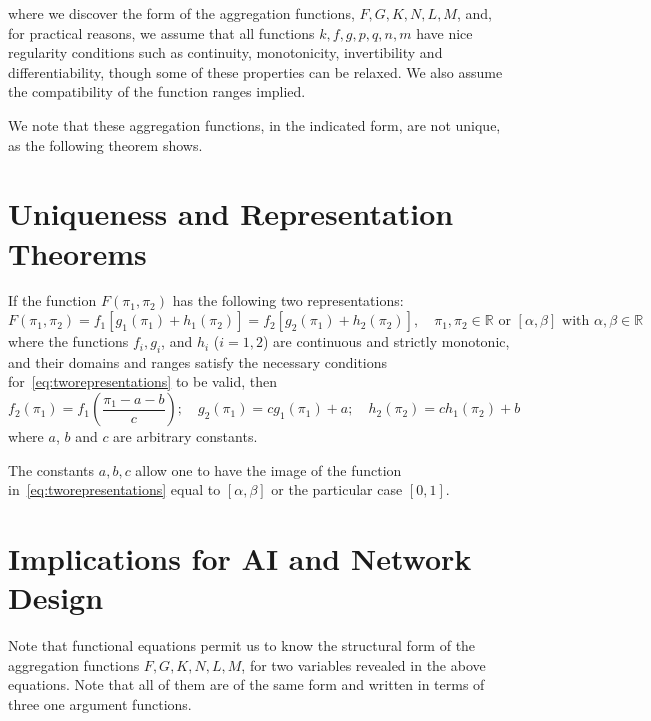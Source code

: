 \documentclass[
	11pt, %
	fleqn, %
	a4paper, %
]{LegrandOrangeBook}
\begin{document}
where we discover the form of the aggregation functions, $F,G,K,N,L,M$, and, for practical reasons, we assume that all functions $k, f,g, p,q,n,m$ have nice regularity conditions such as continuity, monotonicity, invertibility and differentiability, though some of these properties can be relaxed. We also assume the compatibility of the function ranges implied.

We note that these aggregation functions, in the indicated form, are not unique, as the following theorem shows.

\section{Uniqueness and Representation Theorems}
\begin{theorem}
\label{thm:uniqueness}
If the function $F(\pi_1,\pi_2)$ has the following two representations:
\begin{equation}
F(\pi_1,\pi_2) = f_1[g_1(\pi_1) + h_1(\pi_2)] = f_2[g_2(\pi_1) + h_2(\pi_2)], \quad \pi_1,\pi_2 \in \mathbb{R} \text{ or } [\alpha, \beta] \text{ with } \alpha, \beta \in \mathbb{R}
\label{eq:tworepresentations}
\end{equation}
where the functions $f_i,g_i$, and $h_i$ ($i = 1,2$) are continuous and strictly monotonic, and their domains and ranges satisfy the necessary conditions for~\eqref{eq:tworepresentations} to be valid, then
\begin{equation}
f_2(\pi_1) = f_1\left(\frac{\pi_1 - a - b}{c}\right); \quad g_2(\pi_1) = cg_1(\pi_1) + a; \quad h_2(\pi_2) = ch_1(\pi_2) + b
\label{eq:uniquenessrelations}
\end{equation}
where $a$, $b$ and $c$ are arbitrary constants.

The constants $a,b,c$ allow one to have the image of the function in~\eqref{eq:tworepresentations} equal to $[\alpha,\beta]$ or the particular case $[0,1]$.
\end{theorem}

\section{Implications for AI and Network Design}
Note that functional equations permit us to know the structural form of the aggregation functions $F,G,K,N,L,M$, for two variables revealed in the above equations. Note that all of them are of the same form and written in terms of three one argument functions.
\end{document}

